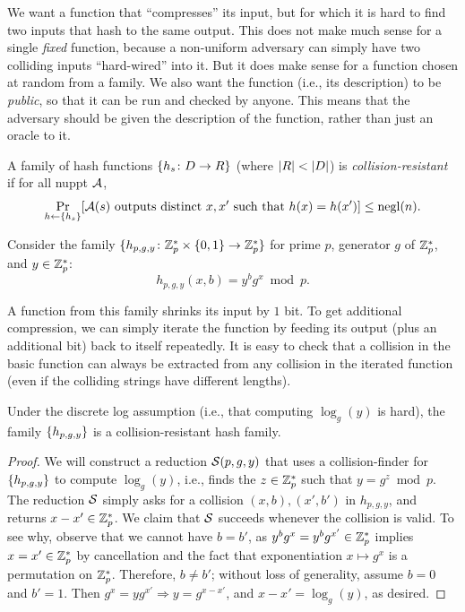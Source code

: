 \documentclass[11pt]{article}
\begin{document}
We want a function that ``compresses'' its input, but for which it is
hard to find two inputs that hash to the same output.  This does not
make much sense for a single \emph{fixed} function, because a
non-uniform adversary can simply have two colliding inputs
``hard-wired'' into it.  But it does make sense for a function chosen
at random from a family.  We also want the function (i.e., its
description) to be \emph{public}, so that it can be run and checked by
anyone.  This means that the adversary should be given the description
of the function, rather than just an oracle to it.

\begin{definition}
  A family of hash functions $\{h_s \colon D \to R\}$ (where
  $\lvert R\rvert < \lvert D\rvert$) is \emph{collision-resistant} if for all nuppt
  $\mathcal{A}$,
  \[ \Pr_{h \gets \{ h_s \}} [\mathcal{A}(s) \text{ outputs distinct } x, x'
  \text{ such that } h(x) = h(x')] \leq \operatorname{negl}(n). \]
\end{definition}

\begin{example}
  Consider the family $\{h_{p,g,y} \colon \mathbb{Z}_p^{*} \times \{0,1\} \to
    \mathbb{Z}_p^{*}\}$ for prime $p$, generator $g$ of $\mathbb{Z}_p^*$, and $y \in
  \mathbb{Z}_p^*$:
  \[h_{p,g,y}(x,b) = y^b g^x \bmod p. \]
\end{example}

A function from this family shrinks its input by $1$ bit.  To get
additional compression, we can simply iterate the function by feeding
its output (plus an additional bit) back to itself repeatedly.  It is
easy to check that a collision in the basic function can always be
extracted from any collision in the iterated function (even if the
colliding strings have different lengths).

\begin{claim}
  Under the discrete log assumption (i.e., that computing
  $\log_{g}(y)$ is hard), the family $\{h_{p,g,y}\}$ is a
  collision-resistant hash family.
\end{claim}

\begin{proof}
  We will construct a reduction $\mathcal{S}(p,g,y)$ that uses a
  collision-finder for $\{h_{p,g,y}\}$ to compute $\log_{g}(y)$,
  i.e., finds the $z \in \mathbb{Z}_p^{*}$ such that $y = g^z \bmod p$.  The
  reduction $\mathcal{S}$ simply asks for a collision $(x,b), (x',b')$ in
  $h_{p,g,y}$, and returns $x-x' \in \mathbb{Z}_p^{*}$.  We claim that $\mathcal{S}$
  succeeds whenever the collision is valid.  To see why, observe that
  we cannot have $b = b'$, as $y^b g^x = y^{b} g^{x'} \in \mathbb{Z}_p^{*}$
  implies $x = x' \in \mathbb{Z}_p^{*}$ by cancellation and the fact that
  exponentiation $x \mapsto g^{x}$ is a permutation on $\mathbb{Z}_p^{*}$.
  Therefore, $b \neq b'$; without loss of generality, assume $b = 0$
  and $b' = 1$.  Then $g^x = y g^{x'} \Rightarrow y = g^{x - x'}$, and
  $x-x' = \log_{g}(y)$, as desired.
\end{proof}
\end{document}
